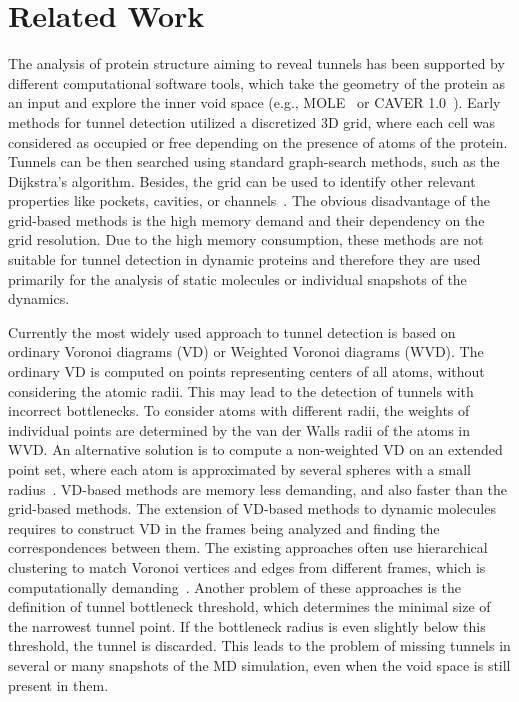 \documentclass[usletter, 10pt, conference]{svjour3}      %
\begin{document}
\section{Related Work}


The analysis of protein structure aiming to reveal tunnels has been supported by different computational software tools, which take the geometry of the protein as an input and explore the inner void space (e.g., MOLE~\cite{Petrek20071357} or CAVER 1.0~\cite{petrek2006caver}).
Early methods for tunnel detection utilized a discretized 3D grid, where each cell was considered as occupied or free depending on the presence of atoms of the protein.
Tunnels can be then searched using standard graph-search methods, such as the Dijkstra's algorithm.
Besides, the grid can be used to identify other relevant properties like pockets, cavities, or channels~\cite{sehnal2013mole,petrek2006caver}.
The obvious disadvantage of the grid-based methods is the high memory demand and their dependency on the grid resolution.
Due to the high memory consumption, these methods are not suitable for tunnel detection in dynamic proteins and therefore they are used primarily for the analysis of static molecules or individual snapshots of the dynamics.

Currently the most widely used approach to tunnel detection is based on ordinary Voronoi diagrams (VD) or Weighted Voronoi diagrams (WVD).
The ordinary VD is computed on points representing centers of all atoms, without considering the atomic radii.
This may lead to the detection of tunnels with incorrect bottlenecks. %
To consider atoms with different radii, the weights of individual points are determined by the van der Walls radii of the atoms in WVD.
An alternative solution is to compute a non-weighted VD on an extended point set, where each atom is approximated by several spheres with a small radius~\cite{yaffe2008,caver3,caverDetails}.
VD-based methods are memory less demanding, and also faster than the grid-based methods.
The extension of VD-based methods to dynamic molecules requires to construct VD in the frames being analyzed and finding the correspondences between them.
The existing approaches often use hierarchical clustering to match Voronoi vertices and edges from different frames, which is computationally demanding~\cite{lindow2012dynamic,caverDetails}.
Another problem of these approaches is the definition of tunnel bottleneck threshold, which determines the minimal size of the narrowest tunnel point.
If the bottleneck radius is even slightly below this threshold, the tunnel is discarded. 
This leads to the problem of missing tunnels in several or many snapshots of the MD simulation, even when the void space is still present in them.
\end{document}

